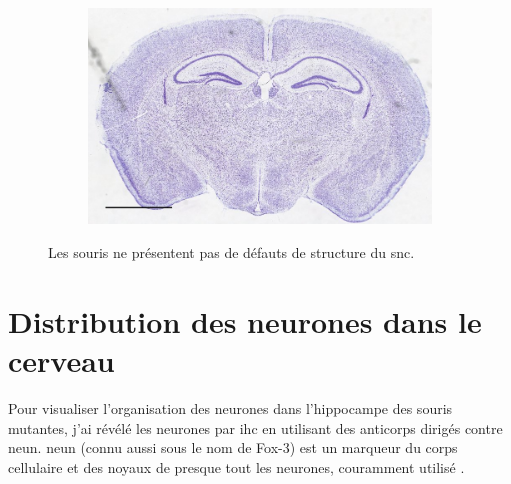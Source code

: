 \begin{figure}[h]
\begin{center}
\begin{subfigure}[h]{0.49\textwidth}
			\end{subfigure}
			\begin{subfigure}[h]{0.49\textwidth}%
				\caption{}
				\label{fig:MaleMutNissl}
				\includegraphics[width=\textwidth]{./Images/Nissl/MaleMut.jpg}
			\end{subfigure}
		\end{center}
		\caption{Les souris \mcrd ne présentent pas de défauts de structure du \acrshort{snc}.}
		\label{fig:NisslResultat}
	\end{figure}
	\FloatBarrier

\section{Distribution des neurones dans le cerveau}
	\label{sec:neun}
	Pour visualiser l'organisation des neurones dans l'hippocampe des souris mutantes, j'ai révélé les neurones par \acrshort{ihc} en utilisant des anticorps dirigés contre \acrshort{neun}. \Acrshort{neun} (connu aussi sous le nom de Fox-3) est un marqueur du  corps cellulaire et des noyaux de presque tout les neurones, couramment utilisé \cite{Guselnikova2015, Kim2009}. 
	
